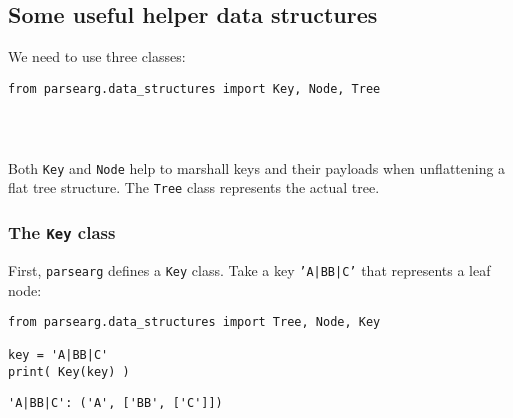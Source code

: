 \documentclass[10pt]{amsart}
\numberwithin{equation}{section}
\begin{document}
\subsection{Some useful helper data structures}
\label{sec:orgd65ca40}
We need to use three classes:
\begin{verbatim}
from parsearg.data_structures import Key, Node, Tree
\end{verbatim}

\begin{verbatim}



\end{verbatim}


Both \texttt{Key} and \texttt{Node} help to marshall keys and their payloads when 
unflattening a flat tree structure. The \texttt{Tree} class represents the
actual tree. 

\subsubsection{The \texttt{Key} class}
\label{sec:org442b1d2}
First, \texttt{parsearg} defines a \texttt{Key} class. Take a key  \texttt{'A|BB|C'} that represents
a leaf node:
\begin{verbatim}
from parsearg.data_structures import Tree, Node, Key

key = 'A|BB|C'
print( Key(key) )
\end{verbatim}

\begin{verbatim}
'A|BB|C': ('A', ['BB', ['C']])


\end{verbatim}
\end{document}
